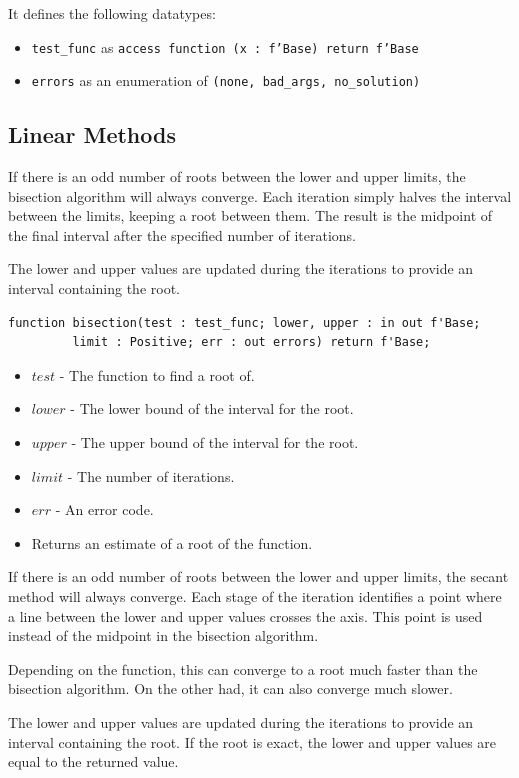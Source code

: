 \documentclass[10pt, openany]{book}
\newcommand{\indexfunc}[1]{\index[func]{#1}}
\newcommand{\datatype}[1]{\texttt{#1}}
\begin{document}
It defines the following datatypes:
\begin{itemize}
   \item \datatype{test\_func} as \datatype{access function (x : f'Base) return f'Base}
   \item \datatype{errors} as an enumeration of \datatype{(none, bad\_args, no\_solution)}
\end{itemize}

\subsection{Linear Methods}
If there is an odd number of roots between the lower and upper limits, the bisection algorithm will always converge.  Each iteration simply halves the interval between the limits, keeping a root between them.  The result is the midpoint of the final interval after the specified number of iterations.

The lower and upper values are updated during the iterations to provide an interval containing the root.
\begin{lstlisting}
function bisection(test : test_func; lower, upper : in out f'Base;
         limit : Positive; err : out errors) return f'Base;
\end{lstlisting}
\indexfunc{root-real-bisection}
\begin{itemize}
  \item $test$ - The function to find a root of.
  \item $lower$ - The lower bound of the interval for the root.
  \item $upper$ - The upper bound of the interval for the root.
  \item $limit$ - The number of iterations.
  \item $err$ - An error code.
  \item Returns an estimate of a root of the function.
\end{itemize}

If there is an odd number of roots between the lower and upper limits, the secant method will always converge.  Each stage of the iteration identifies a point where a line between the lower and upper values crosses the axis.  This point is used instead of the midpoint in the bisection algorithm.

Depending on the function, this can converge to a root much faster than the bisection algorithm.  On the other had, it can also converge much slower.

The lower and upper values are updated during the iterations to provide an interval containing the root.  If the root is exact, the lower and upper values are equal to the returned value.
\end{document}
